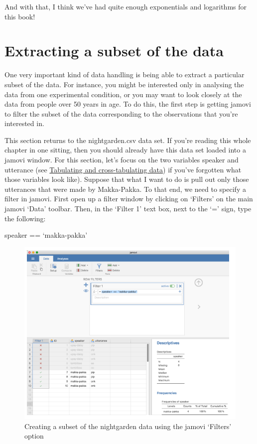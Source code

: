 \documentclass[
]{book}
\begin{document}
And with that, I think we've had quite enough exponentials and logarithms for this book!

\hypertarget{extracting-a-subset-of-the-data}{%
\section{Extracting a subset of the data}\label{extracting-a-subset-of-the-data}}

One very important kind of data handling is being able to extract a particular subset of the data. For instance, you might be interested only in analysing the data from one experimental condition, or you may want to look closely at the data from people over 50 years in age. To do this, the first step is getting jamovi to filter the subset of the data corresponding to the observations that you're interested in.

This section returns to the nightgarden.csv data set. If you're reading this whole chapter in one sitting, then you should already have this data set loaded into a jamovi window. For this section, let's focus on the two variables speaker and utterance (see \protect\hyperlink{tabulating-and-cross-tabulating-data}{Tabulating and cross-tabulating data}) if you've forgotten what those variables look like). Suppose that what I want to do is pull out only those utterances that were made by Makka-Pakka. To that end, we need to specify a filter in jamovi. First open up a filter window by clicking on `Filters' on the main jamovi `Data' toolbar. Then, in the `Filter 1' text box, next to the `=' sign, type the following:

speaker == `makka-pakka'

\begin{figure}
\includegraphics[width=0.9\linewidth]{images/Figure42} \caption{Creating a subset of the nightgarden data using the jamovi ‘Filters’ option}\label{fig:fig6-10}
\end{figure}
\end{document}
